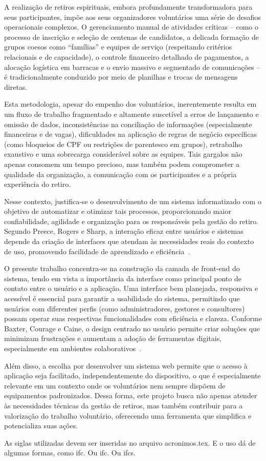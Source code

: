 A realização de retiros espirituais, embora profundamente transformadora para seus participantes, impõe aos seus organizadores voluntários uma série de desafios operacionais complexos. O gerenciamento manual de atividades críticas – como o processo de inscrição e seleção de centenas de candidatos, a delicada formação de grupos coesos como ``famílias'' e equipes de serviço (respeitando critérios relacionais e de capacidade), o controle financeiro detalhado de pagamentos, a alocação logística em barracas e o envio massivo e segmentado de comunicações – é tradicionalmente conduzido por meio de planilhas e trocas de mensagens diretas.

Esta metodologia, apesar do empenho dos voluntários, inerentemente resulta em um fluxo de trabalho fragmentado e altamente suscetível a erros de lançamento e omissão de dados, inconsistências na conciliação de informações (especialmente financeiras e de vagas), dificuldades na aplicação de regras de negócio específicas (como bloqueios de CPF ou restrições de parentesco em grupos), retrabalho exaustivo e uma sobrecarga considerável sobre as equipes. Tais gargalos não apenas consomem um tempo precioso, mas também podem comprometer a qualidade da organização, a comunicação com os participantes e a própria experiência do retiro.

Nesse contexto, justifica-se o desenvolvimento de um sistema informatizado com o objetivo de automatizar e otimizar tais processos, proporcionando maior confiabilidade, agilidade e organização para os responsáveis pela gestão do retiro. Segundo Preece, Rogers e Sharp, a interação eficaz entre usuários e sistemas depende da criação de interfaces que atendam às necessidades reais do contexto de uso, promovendo facilidade de aprendizado e eficiência~\cite{preece2013}.

O presente trabalho concentra-se na construção da camada de front-end do sistema, tendo em vista a importância da interface como principal ponto de contato entre o usuário e a aplicação. Uma interface bem planejada, responsiva e acessível é essencial para garantir a usabilidade do sistema, permitindo que usuários com diferentes perfis (como administradores, gestores e consultores) possam operar suas respectivas funcionalidades com eficiência e clareza. Conforme Baxter, Courage e Caine, o design centrado no usuário permite criar soluções que minimizam frustrações e aumentam a adoção de ferramentas digitais, especialmente em ambientes colaborativos~\cite{baxter2015}.

Além disso, a escolha por desenvolver um sistema web permite que o acesso à aplicação seja facilitado, independentemente do dispositivo, o que é especialmente relevante em um contexto onde os voluntários nem sempre dispõem de equipamentos padronizados. Dessa forma, este projeto busca não apenas atender às necessidades técnicas da gestão de retiros, mas também contribuir para a valorização do trabalho voluntário, oferecendo uma ferramenta que simplifica e potencializa suas ações.

As siglas utilizadas devem ser inseridas no arquivo acronimos.tex. E o uso dá de algumas formas, como \gls{ifc}. Ou \acrlong{ifc}. Ou \glspl{ifc}.
% 
%